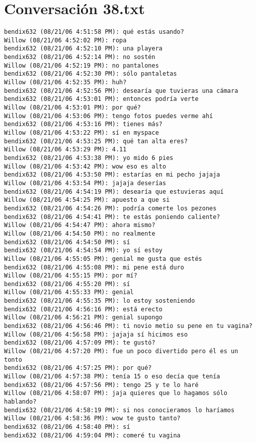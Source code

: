 \section{Conversaci\'on 38.txt}

\begin{verbatim}
bendix632 (08/21/06 4:51:58 PM): qué estás usando?
Willow (08/21/06 4:52:02 PM): ropa
bendix632 (08/21/06 4:52:10 PM): una playera
bendix632 (08/21/06 4:52:14 PM): no sostén
Willow (08/21/06 4:52:19 PM): no pantalones
bendix632 (08/21/06 4:52:30 PM): sólo pantaletas
Willow (08/21/06 4:52:35 PM): huh?
bendix632 (08/21/06 4:52:56 PM): desearía que tuvieras una cámara
bendix632 (08/21/06 4:53:01 PM): entonces podría verte
Willow (08/21/06 4:53:01 PM): por qué?
Willow (08/21/06 4:53:06 PM): tengo fotos puedes verme ahí
bendix632 (08/21/06 4:53:16 PM): tienes más?
Willow (08/21/06 4:53:22 PM): sí en myspace
bendix632 (08/21/06 4:53:25 PM): qué tan alta eres?
Willow (08/21/06 4:53:29 PM): 4.11
bendix632 (08/21/06 4:53:38 PM): yo mido 6 pies
Willow (08/21/06 4:53:42 PM): wow eso es alto
bendix632 (08/21/06 4:53:50 PM): estarías en mi pecho jajaja
Willow (08/21/06 4:53:54 PM): jajaja deserías
bendix632 (08/21/06 4:54:19 PM): desearía que estuvieras aquí
Willow (08/21/06 4:54:25 PM): apuesto a que si
bendix632 (08/21/06 4:54:26 PM): podría comerte los pezones
bendix632 (08/21/06 4:54:41 PM): te estás poniendo caliente?
Willow (08/21/06 4:54:47 PM): ahora mismo?
Willow (08/21/06 4:54:50 PM): no realmente
bendix632 (08/21/06 4:54:50 PM): sí
bendix632 (08/21/06 4:54:54 PM): yo sí estoy
Willow (08/21/06 4:55:05 PM): genial me gusta que estés
bendix632 (08/21/06 4:55:08 PM): mi pene está duro
Willow (08/21/06 4:55:15 PM): por mí?
bendix632 (08/21/06 4:55:20 PM): sí
Willow (08/21/06 4:55:33 PM): genial
bendix632 (08/21/06 4:55:35 PM): lo estoy sosteniendo
bendix632 (08/21/06 4:56:16 PM): está erecto
Willow (08/21/06 4:56:21 PM): genial supongo
bendix632 (08/21/06 4:56:46 PM): ti novio metio su pene en tu vagina?
Willow (08/21/06 4:56:58 PM): jajaja sí hicimos eso
bendix632 (08/21/06 4:57:09 PM): te gustó?
Willow (08/21/06 4:57:20 PM): fue un poco divertido pero él es un tonto
bendix632 (08/21/06 4:57:25 PM): por qué?
Willow (08/21/06 4:57:38 PM): tenía 15 o eso decía que tenía
bendix632 (08/21/06 4:57:56 PM): tengo 25 y te lo haré
Willow (08/21/06 4:58:07 PM): jaja quieres que lo hagamos sólo hablando?
bendix632 (08/21/06 4:58:19 PM): si nos conocieramos lo haríamos
Willow (08/21/06 4:58:36 PM): wow te gusto tanto?
bendix632 (08/21/06 4:58:40 PM): sí
bendix632 (08/21/06 4:59:04 PM): comeré tu vagina

\end{verbatim}
